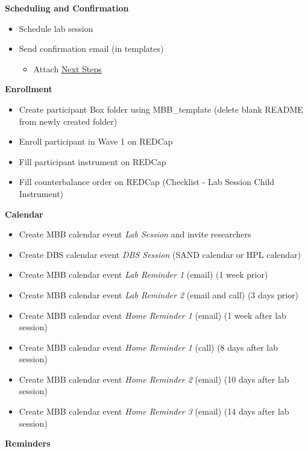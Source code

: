 \documentclass[]{book}
\providecommand{\tightlist}{%
  \setlength{\itemsep}{0pt}\setlength{\parskip}{0pt}}
\begin{document}
\textbf{Scheduling and Confirmation}

\begin{itemize}
\tightlist
\item
  Schedule lab session
\item
  Send confirmation email (in templates)

  \begin{itemize}
  \tightlist
  \item
    Attach \href{https://app.box.com/file/630326369239}{Next Steps}
  \end{itemize}
\end{itemize}

\textbf{Enrollment}

\begin{itemize}
\tightlist
\item
  Create participant Box folder using MBB\_template (delete blank README from newly created folder)
\item
  Enroll participant in Wave 1 on REDCap
\item
  Fill participant instrument on REDCap
\item
  Fill counterbalance order on REDCap (Checklist - Lab Session Child Instrument)
\end{itemize}

\textbf{Calendar}

\begin{itemize}
\tightlist
\item
  Create MBB calendar event \emph{Lab Session} and invite researchers
\item
  Create DBS calendar event \emph{DBS Session} (SAND calendar or HPL calendar)
\item
  Create MBB calendar event \emph{Lab Reminder 1} (email) (1 week prior)
\item
  Create MBB calendar event \emph{Lab Reminder 2} (email and call) (3 days prior)
\item
  Create MBB calendar event \emph{Home Reminder 1} (email) (1 week after lab session)
\item
  Create MBB calendar event \emph{Home Reminder 1} (call) (8 days after lab session)
\item
  Create MBB calendar event \emph{Home Reminder 2} (email) (10 days after lab session)
\item
  Create MBB calendar event \emph{Home Reminder 3} (email) (14 days after lab session)
\end{itemize}

\textbf{Reminders}
\end{document}
